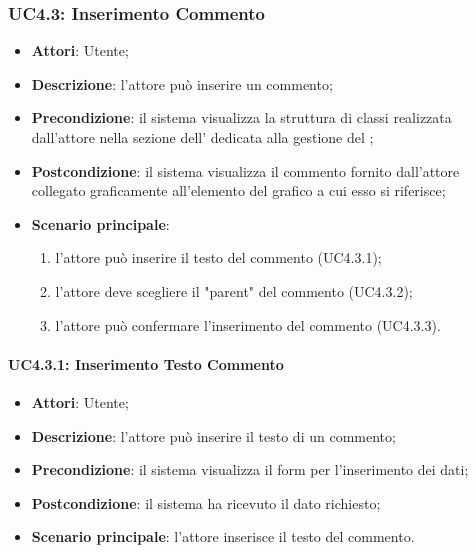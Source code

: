 \subsubsection{UC4.3: Inserimento Commento}
\label{UC4.3}
\begin{itemize}
	\item \textbf{Attori}: Utente;
	\item \textbf{Descrizione}: l'attore può inserire un commento;
	\item \textbf{Precondizione}: il sistema visualizza la struttura di classi realizzata dall'attore nella sezione dell' dedicata alla gestione del ;
	\item \textbf{Postcondizione}: il sistema visualizza il commento fornito dall'attore collegato graficamente all'elemento del grafico a cui esso si riferisce;
	\item \textbf{Scenario principale}:
	\begin{enumerate}
		\item l'attore può inserire il testo del commento (UC4.3.1);
		\item l'attore deve scegliere il "parent" del commento (UC4.3.2);
		\item l'attore può confermare l'inserimento del commento (UC4.3.3).
	\end{enumerate}
\end{itemize}

\paragraph{UC4.3.1: Inserimento Testo Commento}
\label{UC4.3.1}
\begin{itemize}
	\item \textbf{Attori}: Utente;
	\item \textbf{Descrizione}: l'attore può inserire il testo di un commento;
	\item \textbf{Precondizione}: il sistema visualizza il form per l'inserimento dei dati;
	\item \textbf{Postcondizione}: il sistema ha ricevuto il dato richiesto;
	\item \textbf{Scenario principale}: l'attore inserisce il testo del commento.
\end{itemize}

